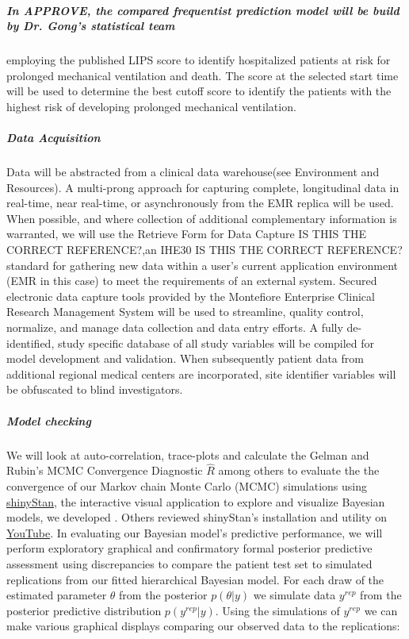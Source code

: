 \documentclass[11pt,notitlepage]{article}
\begin{document}
\subparagraph*{In APPROVE, the compared frequentist prediction model will be build by Dr. Gong's statistical team} employing the published LIPS score \cite{Herridge_12594312} to identify hospitalized patients at risk for prolonged mechanical ventilation and death. The score at the selected start time will be used to determine the best cutoff score to identify the patients with the highest risk of developing prolonged mechanical ventilation.

\subparagraph*{Data Acquisition}
Data will be abstracted from a clinical data warehouse(see Environment and Resources). A multi-prong approach for capturing complete, longitudinal data in real-time, near real-time, or asynchronously from the EMR replica will be used. When possible, and where collection of additional complementary information is warranted, we will use the Retrieve Form for Data Capture IS THIS THE CORRECT REFERENCE?\cite{Rothenhaeusler_2005},an IHE30 IS THIS THE CORRECT REFERENCE? \cite{Rotte_15809512} standard for gathering new data within a user's current application environment (EMR in this case) to meet the requirements of an external system. Secured electronic data capture tools provided by the Montefiore Enterprise Clinical Research Management System will be used to streamline, quality control, normalize, and manage data collection and data entry efforts. A fully de-identified, study specific database of all study variables will be compiled for model development and validation. When subsequently patient data from additional regional medical centers are incorporated, site identifier variables will be obfuscated to blind investigators.

\subparagraph*{Model checking}
We will look at auto-correlation, trace-plots and calculate the Gelman and Rubin's MCMC Convergence Diagnostic $ \hat{R}$ among others to evaluate the the convergence of our Markov chain Monte Carlo (MCMC) simulations using \href{http://andrewgelman.com/2015/03/02/introducing-shinystan/}{shinyStan}, the interactive visual application to explore and visualize Bayesian models, we developed \cite{shinystan-software:2015}. Others reviewed shinyStan's installation and utility on \href{https://www.youtube.com/watch?v=X31xqNHcvQs}{YouTube}. In evaluating our Bayesian model's predictive performance, we will perform exploratory graphical \cite{Gelman2004posteriorpredictivechecks} and confirmatory formal posterior predictive assessment using discrepancies \cite{GelmanMengStern1996} to compare the patient test set to simulated replications from our fitted hierarchical Bayesian model. For each draw of the estimated parameter $\theta$ from the posterior $p(\theta|y)$ we simulate data $y^{rep}$ from the posterior predictive distribution $ p(y^{rep}|y) $. Using the simulations of $y^{rep}$ we can make various graphical displays comparing our observed data to the replications:
\end{document}
